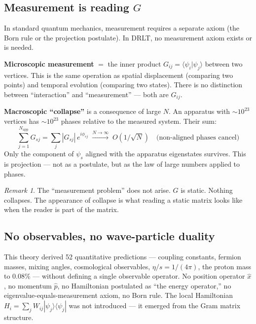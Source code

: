 \documentclass[12pt]{article}
\theoremstyle{remark}
\newtheorem{remark}[theorem]{Remark}
\theoremstyle{definition}
\begin{document}
\subsection{Measurement is reading $G$}

In standard quantum mechanics, measurement requires a separate axiom (the Born rule or the projection postulate). In DRLT, no measurement axiom exists or is needed.

\textbf{Microscopic measurement} $=$ the inner product $G_{ij} = \langle\psi_i|\psi_j\rangle$ between two vertices. This is the same operation as spatial displacement (comparing two points) and temporal evolution (comparing two states). There is no distinction between ``interaction'' and ``measurement'' --- both are $G_{ij}$.

\textbf{Macroscopic ``collapse''} is a consequence of large $N$. An apparatus with $\sim\!10^{23}$ vertices has $\sim\!10^{23}$ phases relative to the measured system. Their sum:
\begin{equation}
\sum_{j=1}^{N_\text{app}} G_{sj} = \sum_{j} |G_{sj}|\,e^{i\phi_{sj}} \;\xrightarrow{N \to \infty}\; O(1/\sqrt{N}) \quad\text{(non-aligned phases cancel)}
\end{equation}
Only the component of $\psi_s$ aligned with the apparatus eigenstates survives. This is projection --- not as a postulate, but as the law of large numbers applied to phases.

\begin{remark}
The ``measurement problem'' does not arise. $G$ is static. Nothing collapses. The appearance of collapse is what reading a static matrix looks like when the reader is part of the matrix.
\end{remark}

\subsection{No observables, no wave-particle duality}

This theory derived 52 quantitative predictions --- coupling constants, fermion masses, mixing angles, cosmological observables, $\eta/s = 1/(4\pi)$, the proton mass to 0.08\% --- without defining a single observable operator. No position operator $\hat{x}$, no momentum $\hat{p}$, no Hamiltonian postulated as ``the energy operator,'' no eigenvalue-equals-measurement axiom, no Born rule. The local Hamiltonian $H_i = \sum_j W_{ij}|\psi_j\rangle\langle\psi_j|$ was not introduced --- it emerged from the Gram matrix structure.
\end{document}
